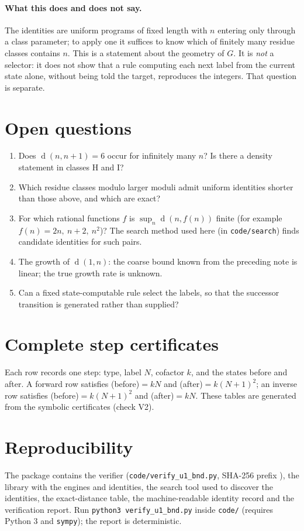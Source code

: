 \documentclass[11pt]{article}
\theoremstyle{definition}
\newcommand{\dist}{\operatorname{d}}
\begin{document}
\paragraph{What this does and does not say.}
The identities are uniform programs of fixed length with $n$ entering only through a class parameter; to apply one it
suffices to know which of finitely many residue classes contains $n$. This is a statement about the geometry of $G$.
It is \emph{not} a selector: it does not show that a rule computing each next label from the current state alone,
without being told the target, reproduces the integers. That question is separate.

\section{Open questions}\label{sec:open}
\begin{enumerate}[leftmargin=*]
\item Does $\dist(n,n+1)=6$ occur for infinitely many $n$? Is there a density statement in classes H and I?
\item Which residue classes modulo larger moduli admit uniform identities shorter than those above, and which are exact?
\item For which rational functions $f$ is $\sup_n\dist(n,f(n))$ finite (for example $f(n)=2n,\ n+2,\ n^2$)? The search
method used here (in \texttt{code/search}) finds candidate identities for such pairs.
\item The growth of $\dist(1,n)$: the coarse bound known from the preceding note is linear; the true growth rate is unknown.
\item Can a fixed state-computable rule select the labels, so that the successor transition is generated rather than
supplied?
\end{enumerate}

\appendix
\section{Complete step certificates}\label{app:cert}
Each row records one step: type, label $N$, cofactor $k$, and the states before and after. A forward row satisfies
(before)$=kN$ and (after)$=k(N+1)^2$; an inverse row satisfies (before)$=k(N+1)^2$ and (after)$=kN$.
These tables are generated from the symbolic certificates (check V2).


\section{Reproducibility}
The package contains the verifier (\texttt{code/verify\_u1\_bnd.py}, SHA-256 prefix \VerSha{}), the library with the engines
and identities, the search tool used to discover the identities, the exact-distance table, the machine-readable
identity record and the verification report. Run \texttt{python3 verify\_u1\_bnd.py} inside \texttt{code/} (requires Python 3 and
\texttt{sympy}); the report is deterministic.
\end{document}
